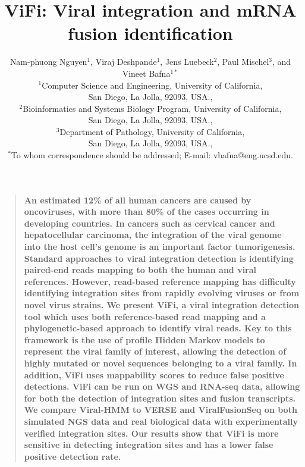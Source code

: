 \documentclass[10pt]{article}
\title{ViFi: Viral integration and mRNA fusion identification}
\author
{Nam-phuong Nguyen$^{1}$, Viraj Deshpande$^{1}$, 
Jens Luebeck$^{2}$, Paul Mischel$^{3}$, and Vineet Bafna$^{1\ast}$\\
\normalsize{$^{1}$Computer Science and Engineering, University of California,}\\
\normalsize{San Diego, La Jolla, 92093, USA.,}\\
\normalsize{$^{2}$Bioinformatics and Systems Biology Program, University of California,}\\
\normalsize{San Diego, La Jolla, 92093, USA.,}\\
\normalsize{$^{3}$Department of Pathology, University of California,}\\
\normalsize{San Diego, La Jolla, 92093, USA.,}\\
\normalsize{$^\ast$To whom correspondence should be addressed; E-mail:  vbafna@eng.ucsd.edu.}
}
\date{}
\newenvironment{sciabstract}{%
\begin{quote} \bf}
{\end{quote}}
\begin{document}
 


\baselineskip24pt


\maketitle 


\begin{sciabstract}
  An estimated 12\% of all human cancers are caused by oncoviruses, with more than 80\% of the cases occurring in developing countries.  In cancers such as cervical cancer and hepatocellular carcinoma, the integration of the viral genome into the host cell's genome is an important factor tumorigenesis.  Standard approaches to viral integration detection is identifying paired-end reads mapping to both the human and viral references.  However, read-based reference mapping has difficulty identifying integration sites from rapidly evolving viruses or from novel virus strains.  We present ViFi, a viral integration detection tool which uses both reference-based read mapping and a phylogenetic-based approach to identify viral reads.  Key to this framework is the use of profile Hidden Markov models to represent the viral family of interest, allowing the detection of highly mutated or novel  sequences belonging to a viral family.  In addition, ViFi uses mappability scores to reduce false positive detections.  ViFi can be run on WGS and RNA-seq data, allowing for both the detection of integration sites and fusion transcripts.  We compare Viral-HMM to VERSE and ViralFusionSeq on both simulated NGS data and real biological data with experimentally verified integration sites.  Our results show that ViFi is more sensitive in detecting integration sites and has a lower false positive detection rate.
\end{sciabstract}
\end{document}
